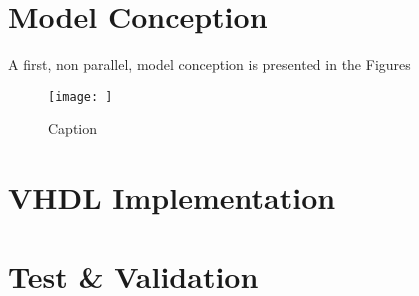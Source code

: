 \section{Model Conception}

A first, non parallel, model conception is presented in the Figures

\begin{figure}
    \centering
    \texttt{[image: ]}
    \caption{Caption}
    \label{fig:my_label}
\end{figure}


\section{VHDL Implementation}


\section{Test \& Validation}













